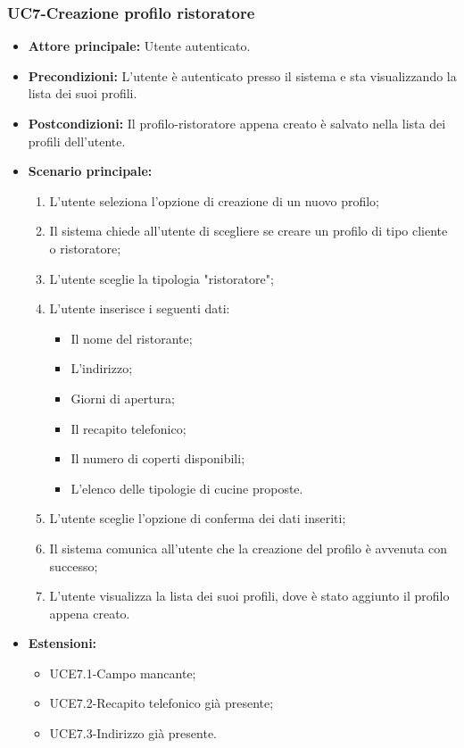 \subsubsection{UC7-Creazione profilo ristoratore}
\begin{itemize}
    \item \textbf{Attore principale:} Utente autenticato.
    \item \textbf{Precondizioni:} L'utente è autenticato presso il sistema e sta visualizzando la lista dei suoi profili.
    \item \textbf{Postcondizioni:} Il profilo-ristoratore appena creato è salvato nella lista dei profili dell'utente.
    \item \textbf{Scenario principale:}
    \begin{enumerate}
        \item L'utente seleziona l'opzione di creazione di un nuovo profilo;
        \item Il sistema chiede all'utente di scegliere se creare un profilo di tipo cliente
        o ristoratore;
        \item L'utente sceglie la tipologia "ristoratore";
        \item L'utente inserisce i seguenti dati:
        \begin{itemize}
            \item Il nome del ristorante;
            \item L'indirizzo;
            \item Giorni di apertura;
            \item Il recapito telefonico;
            \item Il numero di coperti disponibili;
            \item L'elenco delle tipologie di cucine proposte.
        \end{itemize}
        \item L'utente sceglie l'opzione di conferma dei dati inseriti;
        \item Il sistema comunica all'utente che la creazione del profilo è avvenuta con successo;
        \item L'utente visualizza la lista dei suoi profili, dove è stato aggiunto il profilo appena creato.
    \end{enumerate}
        \item \textbf{Estensioni:}
        \begin{itemize}
                \item UCE7.1-Campo mancante;
                \item UCE7.2-Recapito telefonico già presente;
                \item UCE7.3-Indirizzo già presente.
        \end{itemize}
\end{itemize}

